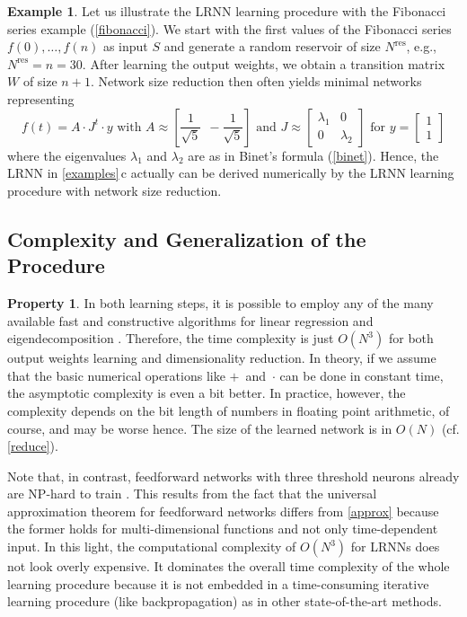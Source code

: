 \documentclass[twoside,11pt]{article}
\theoremstyle{definition}
\newtheorem{exmp}{Example}
\newtheorem{prop}{Property}
\begin{document}
\begin{exmp}\label{continued}
Let us illustrate the LRNN learning procedure with the Fibonacci series example
(\cref{fibonacci}). We start with the first values of the Fibonacci series
$f(0),\dots,f(n)$ as input $S$ and generate a random reservoir of size
$N^\mathrm{res}$, e.g., $N^\mathrm{res}=n=30$. After learning the output
weights, we obtain a transition matrix $W$ of size $n+1$. Network size reduction
then often yields minimal networks representing
\[
    f(t) = A \cdot J^t \cdot y \text{~with~}
	A \approx \left[ \frac{1}{\sqrt{5}} ~~ -\!\frac{1}{\sqrt{5}} \right] \text{~and~}
	J \approx \left[ \begin{array}{cc}
		\lambda_1 & 0\\
		0 & \lambda_2
   	\end{array} \right] \text{~for~}
	y = \left[ \begin{array}{c}
	1\\
	1
   \end{array} \right]
\]
where the eigenvalues $\lambda_1$ and $\lambda_2$ are as in Binet's formula
(\cref{binet}). Hence, the LRNN in \cref{examples}\,c actually can be derived
numerically by the LRNN learning procedure with network size reduction.
\end{exmp}

\subsection{Complexity and Generalization of the Procedure}

\begin{prop}\label{complexity}
In both learning steps, it is possible to employ any of the many available fast
and constructive algorithms for linear regression and eigendecomposition
\citep{DDH07}. Therefore, the time complexity is just $O(N^3)$ for both output
weights learning and dimensionality reduction. In theory, if we assume that
the basic numerical operations like $+$~and~$\cdot$ can be done in constant
time, the asymptotic complexity is even a bit better. In practice, however, the
complexity depends on the bit length of numbers in floating point arithmetic,
of course, and may be worse hence. The size of the learned network is in $O(N)$
(cf. \cref{reduce}).
\end{prop}

Note that, in contrast, feedforward networks with three threshold neurons
already are NP-hard to train \citep{BR92}. This results from the fact
that the universal approximation theorem for feedforward networks differs from
\cref{approx} because the former holds for multi-dimensional functions and
not only time-dependent input. In this light, the computational complexity of
$O(N^3)$ for LRNNs does not look overly expensive. It dominates the
overall time complexity of the whole learning procedure because it is not
embedded in a time-consuming iterative learning procedure (like backpropagation)
as in other state-of-the-art methods.
\end{document}
